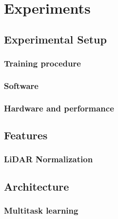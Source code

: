 \chapter{Experiments}%
\label{sec:experiments}

\section{Experimental Setup}
\subsection{Training procedure}
\subsection{Software}
\subsection{Hardware and performance}

\section{Features}


\subsection{LiDAR Normalization}%
\label{sec:normalization-experiment}


\section{Architecture}
\subsection{Multitask learning}

